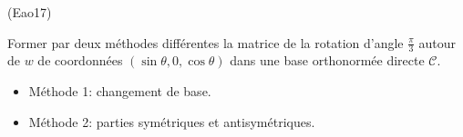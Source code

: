 \begin{tiny}(Eao17)\end{tiny} Former par deux méthodes différentes la matrice de la rotation d'angle $\frac{\pi}{3}$ autour de $w$ de coordonnées $(\sin \theta, 0, \cos \theta)$ dans une base orthonormée directe $\mathcal{C}$.
\begin{itemize}
 \item Méthode 1: changement de base.
 \item Méthode 2: parties symétriques et antisymétriques.
\end{itemize}
